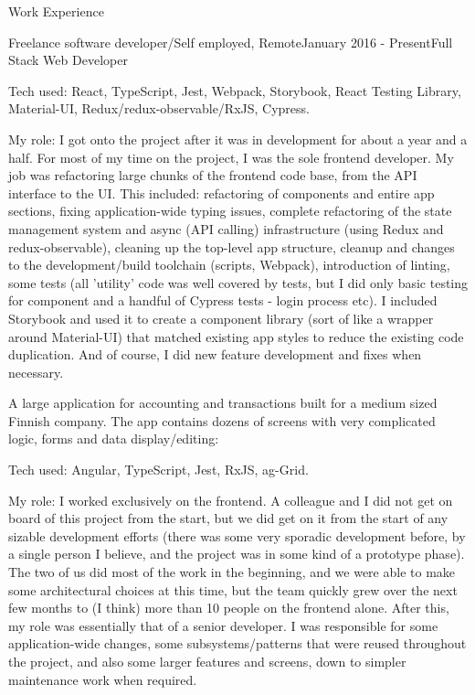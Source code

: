 \documentclass{resume}
\begin{document}
\begin{rSection}{Work Experience}
\begin{rSubsection}{Freelance software developer/Self employed, Remote}{January 2016 - Present}{Full Stack Web Developer}{}
\begin{rList}
\item Tech used: React, TypeScript, Jest, Webpack, Storybook, React Testing Library, Material-UI, Redux/redux-observable/RxJS, Cypress.
\item My role: I got onto the project after it was in development for about a year and a half. For most of my time on the project, I was the sole frontend developer. My job was refactoring large chunks of the frontend code base, from the API interface to the UI. This included: refactoring of components and entire app sections, fixing application-wide typing issues, complete refactoring of the state management system and async (API calling) infrastructure (using Redux and redux-observable), cleaning up the top-level app structure, cleanup and changes to the development/build toolchain (scripts, Webpack), introduction of linting, some tests (all 'utility' code was well covered by tests, but I did only basic testing for component and a handful of Cypress tests - login process etc). I included Storybook and used it to create a component library (sort of like a wrapper around Material-UI) that matched existing app styles to reduce the existing code duplication. And of course, I did new feature development and fixes when necessary.
\end{rList}

A large application for accounting and transactions built for a medium sized Finnish company. The app contains dozens of screens with very complicated logic, forms and data display/editing:

\begin{rList}
\item Tech used: Angular, TypeScript, Jest, RxJS, ag-Grid.
\item My role: I worked exclusively on the frontend. A colleague and I did not get on board of this project from the start, but we did get on it from the start of any sizable development efforts (there was some very sporadic development before, by a single person I believe, and the project was in some kind of a prototype phase). The two of us did most of the work in the beginning, and we were able to make some architectural choices at this time, but the team quickly grew over the next few months to (I think) more than 10 people on the frontend alone. After this, my role was essentially that of a senior developer. I was responsible for some application-wide changes, some subsystems/patterns that were reused throughout the project, and also some larger features and screens, down to simpler maintenance work when required.
\end{rList}


\end{rSubsection}
\end{rSection}
\end{document}
